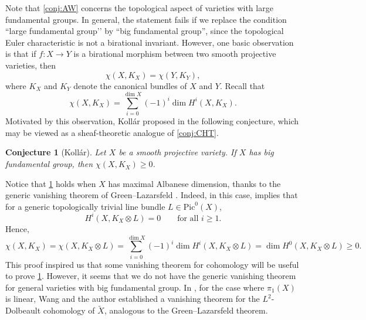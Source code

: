 \documentclass[english]{amsproc}
\theoremstyle{plain}
\newtheorem{conjecture}[thm]{Conjecture}
\theoremstyle{definition}
\theoremstyle{remark}
\theoremstyle{plain}
\numberwithin{equation}{thm} %
\begin{document}
	Note that \cref{conj:AW} concerns the topological aspect of varieties with large 
	fundamental groups. In general, the statement fails if we replace the condition 
	“large fundamental group’’ by “big fundamental group”, since the topological 
	Euler characteristic is not a birational invariant.  
	However, one basic observation is that if 
	$f:X\to Y$ is a birational morphism between two smooth projective varieties, then
	\[
	\chi(X,K_X)=\chi(Y,K_Y),
	\]
	where $K_X$ and $K_Y$ denote the canonical bundles of $X$ and $Y$.  
	Recall that
	\[
	\chi(X,K_X)=\sum_{i=0}^{\dim X}(-1)^i \dim H^i(X,K_X).
	\]
	Motivated by this observation, Koll\'ar proposed in \cite{Kol95} the following conjecture, 
	which may be viewed as a sheaf-theoretic analogue of \cref{conj:CHT}.
	
	\begin{conjecture}[Koll\'ar]\label{conj:kollar}
		Let $X$ be a smooth projective variety.  
		If $X$ has big fundamental group, then $\chi(X,K_X)\geq 0$.  
	\end{conjecture}
	
	Notice that \cref{conj:kollar} holds when $X$ has maximal Albanese dimension, 
	thanks to the generic vanishing theorem of Green--Lazarsfeld \cite{GL87}.  
	Indeed, in this case, \cite{GL87} implies that for a generic topologically trivial 
	line bundle $L\in \mathrm{Pic}^0(X)$, 
	\[
	H^i(X,K_X\otimes L)=0 \qquad \text{for all } i\geq 1.
	\]
	Hence,
	\[
	\chi(X,K_X)
	= \chi(X,K_X\otimes L)
	= \sum_{i=0}^{\dim X} (-1)^i \dim H^i(X,K_X\otimes L)
	= \dim H^0(X,K_X\otimes L)
	\geq 0.
	\] 
	This proof inspired us that some vanishing theorem for cohomology will be useful to prove \cref{conj:kollar}. However, it seems that we do not have the generic vanishing theorem for general varieties with big fundamental group. In \cite{DW24b}, for the case where $\pi_1(X)$ is linear, Wang and the author established a vanishing theorem for the $ {L^2}$-Dolbeault cohomology of $\widetilde{X}$, analogous to the Green--Lazarsfeld theorem. 
	
\end{document}
